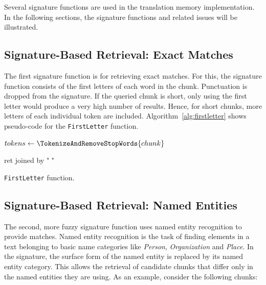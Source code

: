 Several signature functions are used in the translation memory
implementation. In the following sections, the signature functions and related issues will be illustrated.


\subsection{Signature-Based Retrieval: Exact Matches}

The first signature function is for retrieving exact matches. For this,
the signature function consists of the first letters of each word in the
chunk. Punctuation is dropped from the signature. If the queried chunk is
short, only using the first letter would produce a very high number of
results. Hence, for short chunks, more letters of each individual token are
included. Algorithm~\ref{alg:firstletter} shows pseudo-code for the {\tt FirstLetter}
function.

\vspace{1em}
\begin{algorithm}[H]
\label{alg:firstletter}


 \SetAlgoLined

 $tokens \leftarrow \TokenizeAndRemoveStopWords{chunk}$

 \Return ret joined by " "
 \caption{{\tt FirstLetter} function.}
\end{algorithm}




\subsection{Signature-Based Retrieval: Named Entities}

The second, more fuzzy signature function uses named entity recognition
to provide matches. Named entity recognition is the task of finding
elements in a text belonging to basic name categories like
\emph{Person}, \emph{Organization} and \emph{Place}. In the signature,
the surface form of the named entity is replaced by its named entity
category. This allows the retrieval of candidate chunks that differ only
in the named entities they are using. As an example, consider the
following chunks:

